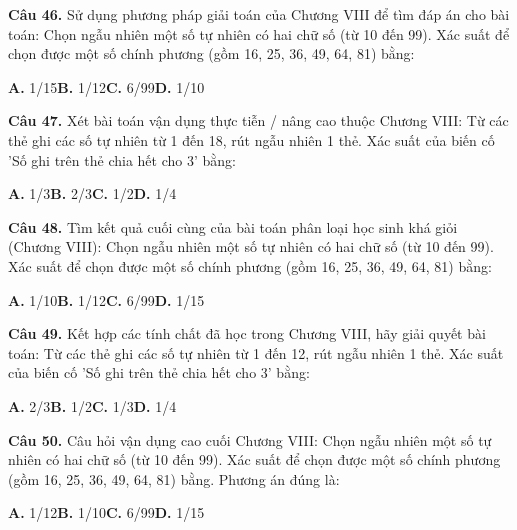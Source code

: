 \documentclass[11pt,a4paper]{article}
\begin{document}
\textbf{\color{primary} Câu 46.} Sử dụng phương pháp giải toán của Chương VIII để tìm đáp án cho bài toán: Chọn ngẫu nhiên một số tự nhiên có hai chữ số (từ 10 đến 99). Xác suất để chọn được một số chính phương (gồm 16, 25, 36, 49, 64, 81) bằng:\par
\hspace*{1.5em}\textbf{A.} 1/15\quad\quad \textbf{B.} 1/12\quad\quad \textbf{C.} 6/99\quad\quad \textbf{D.} 1/10\par\vspace{2pt}
\textbf{\color{primary} Câu 47.} Xét bài toán vận dụng thực tiễn / nâng cao thuộc Chương VIII: Từ các thẻ ghi các số tự nhiên từ 1 đến 18, rút ngẫu nhiên 1 thẻ. Xác suất của biến cố 'Số ghi trên thẻ chia hết cho 3' bằng:\par
\hspace*{1.5em}\textbf{A.} 1/3\quad\quad \textbf{B.} 2/3\quad\quad \textbf{C.} 1/2\quad\quad \textbf{D.} 1/4\par\vspace{2pt}
\textbf{\color{primary} Câu 48.} Tìm kết quả cuối cùng của bài toán phân loại học sinh khá giỏi (Chương VIII): Chọn ngẫu nhiên một số tự nhiên có hai chữ số (từ 10 đến 99). Xác suất để chọn được một số chính phương (gồm 16, 25, 36, 49, 64, 81) bằng:\par
\hspace*{1.5em}\textbf{A.} 1/10\quad\quad \textbf{B.} 1/12\quad\quad \textbf{C.} 6/99\quad\quad \textbf{D.} 1/15\par\vspace{2pt}
\textbf{\color{primary} Câu 49.} Kết hợp các tính chất đã học trong Chương VIII, hãy giải quyết bài toán: Từ các thẻ ghi các số tự nhiên từ 1 đến 12, rút ngẫu nhiên 1 thẻ. Xác suất của biến cố 'Số ghi trên thẻ chia hết cho 3' bằng:\par
\hspace*{1.5em}\textbf{A.} 2/3\quad\quad \textbf{B.} 1/2\quad\quad \textbf{C.} 1/3\quad\quad \textbf{D.} 1/4\par\vspace{2pt}
\textbf{\color{primary} Câu 50.} Câu hỏi vận dụng cao cuối Chương VIII: Chọn ngẫu nhiên một số tự nhiên có hai chữ số (từ 10 đến 99). Xác suất để chọn được một số chính phương (gồm 16, 25, 36, 49, 64, 81) bằng. Phương án đúng là:\par
\hspace*{1.5em}\textbf{A.} 1/12\quad\quad \textbf{B.} 1/10\quad\quad \textbf{C.} 6/99\quad\quad \textbf{D.} 1/15\par\vspace{2pt}
\end{document}
